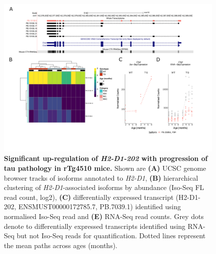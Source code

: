 \begin{landscape}
	\begin{figure}[!htp]
		\centering
		\includegraphics[page=2,trim={1.5cm 3.5cm 2cm 1cm}, scale = 0.85]{Figures/Ch5_DiffPlots_Landscape.pdf}
		\captionsetup{width=1.5\textwidth}
		\caption[Differential \textit{H2-D1} transcript expression]%
		{\textbf{Significant up-regulation of \textit{H2-D1-202} with progression of tau pathology in rTg4510 mice.} Shown are \textbf{(A)} UCSC genome browser tracks of isoforms annotated to \textit{H2-D1}, \textbf{(B)} hierarchical clustering of \textit{H2-D1}-associated isoforms by abundance (Iso-Seq FL read count, log2), \textbf{(C)} differentially expressed transcript (H2-D1-202, ENSMUST00000172785.7, PB.7039.1) identified using normalised Iso-Seq read and \textbf{(E)} RNA-Seq read counts. Grey dots denote to differentially expressed transcripts identified using RNA-Seq but not Iso-Seq reads for quantification. Dotted lines represent the mean paths across ages (months).}   
		\label{fig:H2D1}
	\end{figure}	
\end{landscape}

